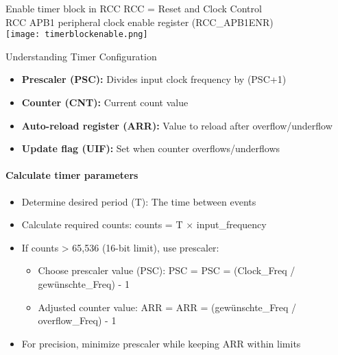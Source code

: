 \multend

\begin{corollary}{Enable timer block in RCC} RCC = Reset and Clock Control\\
    RCC APB1 peripheral clock enable register (RCC\_APB1ENR)\\
    \texttt{[image: timerblockenable.png]}
\end{corollary}

\begin{concept}{Understanding Timer Configuration}
\begin{itemize}
    \item \textbf{Prescaler (PSC):} Divides input clock frequency by (PSC+1)
    \item \textbf{Counter (CNT):} Current count value
    \item \textbf{Auto-reload register (ARR):} Value to reload after overflow/underflow
    \item \textbf{Update flag (UIF):} Set when counter overflows/underflows
\end{itemize}

\paragraph{Calculate timer parameters}
\begin{itemize}
    \item Determine desired period (T): The time between events
    \item Calculate required counts: counts = T × input\_frequency
    \item If counts > 65,536 (16-bit limit), use prescaler:
    \begin{itemize}
        \item Choose prescaler value (PSC): PSC = PSC = (Clock\_Freq / gewünschte\_Freq) - 1
        \item Adjusted counter value: ARR = ARR = (gewünschte\_Freq / overflow\_Freq) - 1
    \end{itemize}
    \item For precision, minimize prescaler while keeping ARR within limits
\end{itemize}
\end{concept}

